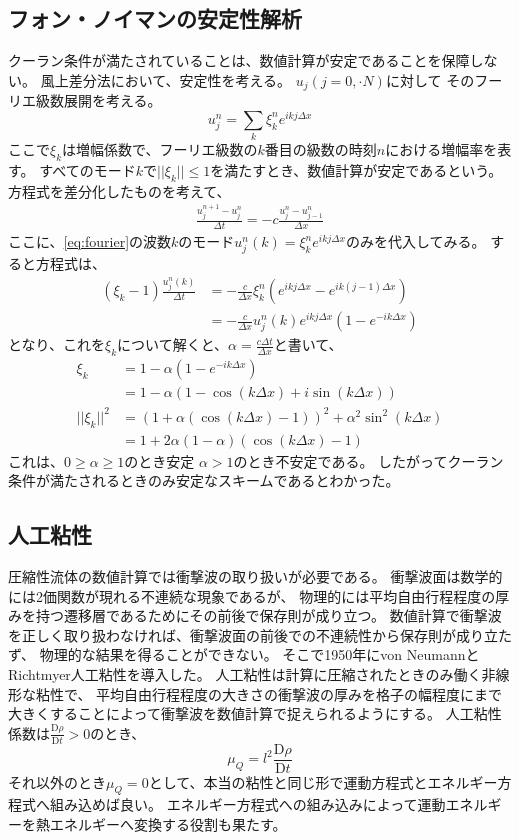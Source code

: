 \documentclass[a4j, dvipdfmx]{jsarticle}
\newcommand{\Dder}[2][]{\frac{\mathrm{D}#1}{\mathrm{D}#2}}
\newcommand{\beq}{\begin{equation}}
\newcommand{\eeq}{\end{equation}}
\begin{document}
\subsection{フォン・ノイマンの安定性解析}
クーラン条件が満たされていることは、数値計算が安定であることを保障しない。
風上差分法において、安定性を考える。
$u_j(j=0,\cdot N)$に対して
そのフーリエ級数展開を考える。
\begin{equation}
    u^n_j = \sum_k \xi^n_k e^{ikj\Delta x}\label{eq:fourier}
\end{equation}
ここで$\xi_k$は増幅係数で、フーリエ級数の$k$番目の級数の時刻$n$における増幅率を表す。
すべてのモード$k$で$||\xi_k||\leq1$を満たすとき、数値計算が安定であるという。
方程式を差分化したものを考えて、
\begin{align}
    \frac{u^{n+1}_j - u^{n}_j}{\Delta t} =- c \frac{u^n_{j} - u^n_{j-1}}{\Delta x}
\end{align}
ここに、\eqref{eq:fourier}の波数$k$のモード$u^n_j(k) = \xi^n_ke^{ikj\Delta x}$のみを代入してみる。
すると方程式は、
\begin{align}
    (\xi_k -1)\frac{u^n_j(k)}{\Delta t}&=- \frac{c}{\Delta x} \xi^n_k(e^{ikj\Delta x} - e^{ik(j-1)\Delta x})\\
                                        &=- \frac{c}{\Delta x} u^n_j(k)e^{ikj\Delta x}(1 - e^{-ik\Delta x})
\end{align}
となり、これを$\xi_k$について解くと、$\alpha = \frac{c\Delta t}{\Delta x}$と書いて、
\begin{align}
    \xi_k &= 1 -  \alpha(1 - e^{-ik\Delta x})\\
          &= 1 - \alpha (1 - \cos(k\Delta x) + i\sin(k\Delta x))\\
    ||\xi_k||^2 &= (1 + \alpha(\cos(k\Delta x) -1))^2 + \alpha^2 \sin^2(k\Delta x)\\
                &= 1 + 2\alpha(1-\alpha)(\cos(k\Delta x) -1)
\end{align}
これは、$0 \geq \alpha \geq 1$のとき安定
$\alpha > 1$のとき不安定である。
したがってクーラン条件が満たされるときのみ安定なスキームであるとわかった。
\subsection{人工粘性}
圧縮性流体の数値計算では衝撃波の取り扱いが必要である。
衝撃波面は数学的には2価関数が現れる不連続な現象であるが、
物理的には平均自由行程程度の厚みを持つ遷移層であるためにその前後で保存則が成り立つ。
数値計算で衝撃波を正しく取り扱わなければ、衝撃波面の前後での不連続性から保存則が成り立たず、
物理的な結果を得ることができない。
そこで1950年にvon NeumannとRichtmyer人工粘性を導入した。
人工粘性は計算に圧縮されたときのみ働く非線形な粘性で、
平均自由行程程度の大きさの衝撃波の厚みを格子の幅程度にまで大きくすることによって衝撃波を数値計算で捉えられるようにする。
人工粘性係数は$\Dder[\rho]{t} > 0$のとき、
\beq
\mu_Q = l^2 \Dder[\rho]{t} 
\eeq
それ以外のとき$\mu_Q = 0$として、本当の粘性と同じ形で運動方程式とエネルギー方程式へ組み込めば良い。
エネルギー方程式への組み込みによって運動エネルギーを熱エネルギーへ変換する役割も果たす。
\end{document}
